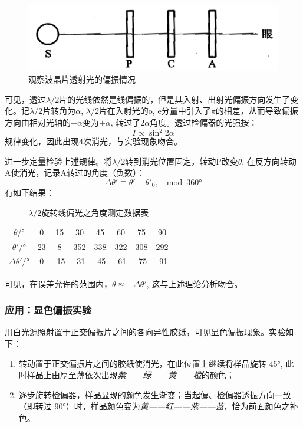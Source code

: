 \documentclass[a4paper,10pt]{article}
\begin{document}
	\begin{figure}[!h]
	\centering
	\includegraphics[width=.5\linewidth]{waveplate}
	\caption{观察波晶片透射光的偏振情况}
	\end{figure}
	
	可见，透过$\lambda/2$片的光线依然是线偏振的，但是其入射、出射光偏振方向发生了变化。记$\lambda/2$片转角为$\alpha$, $\lambda/2$片在入射光的o, e分量中引入了$\pi$的相差，从而导致偏振方向由相对光轴的$-\alpha$变为$+\alpha$, 转过了$2\alpha$角度。透过检偏器的光强按：
	\[ I \propto \sin^2 2\alpha \]
	规律变化，因此出现4次消光，与实验现象吻合。
	
	进一步定量检验上述规律。将$\lambda/2$转到消光位置固定，转动P改变$\theta$, 在反方向转动A使消光，记录A转过的角度（负数）：
	\[ \Delta\theta' \equiv \theta' - \theta'_0,\ 
		\mod \ang{360} \]
	有如下结果：
	\begin{table}[!h]
	\centering
	\caption{$\lambda/2$旋转线偏光之角度测定数据表}
	\begin{tabular}{c|@{\hspace{1.5em}}SSSSSSS@{\hspace{-.5em}}}
	\toprule
		$\theta/\si{\degree}$ &
		0     & 15    & 30    & 45    & 60    & 75    & 90  \\
		$\theta'/\si{\degree}$ &
		23    & 8     & 352   & 338   & 322   & 308   & 292 \\
		$\Delta\theta'/\si{\degree}$ &
		0     & -15   & -31   & -45   & -61   & -75   & -91 \\
	\bottomrule
	\end{tabular}
	\end{table}
	
	\noindent 可见，在误差允许的范围内，$\theta \approxeq - \Delta\theta'$, 这与上述理论分析吻合。
\subsubsection{应用：显色偏振实验}
	用白光源照射置于正交偏振片之间的各向异性胶纸，可见显色偏振现象。实验如下：
	\begin{enumerate}
	\item 转动置于正交偏振片之间的胶纸使消光，在此位置上继续将样品旋转 \ang{45}, 此时样品上由厚至薄依次出现\textit{紫——绿——黄——橙}的颜色；
	\item 逐步旋转检偏器，样品显现的颜色发生渐变；当起偏、检偏器透振方向一致（即转过 \ang{90}）时，样品颜色变为\textit{黄——红——紫——蓝}，恰为前面颜色之补色。
	\end{enumerate}
	
\end{document}
